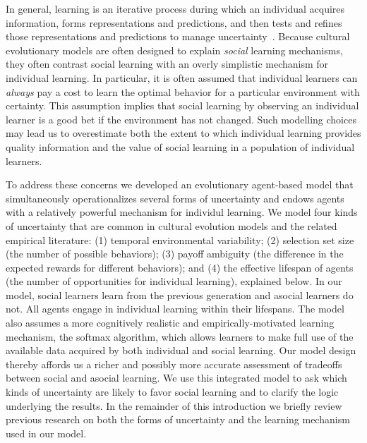 \documentclass[letterpaper,11.5pt]{scrartcl}
\begin{document}
In general, learning is an iterative
process during which an individual acquires information, forms representations and
predictions, and then tests and refines those representations and predictions to manage
uncertainty~\cite{jacobs2011bayesian,clark2013whatever}.  Because cultural evolutionary
models are often designed to explain \emph{social} learning mechanisms, they often contrast social learning with an overly simplistic mechanism for individual learning. In particular, it is often assumed that individual learners can \emph{always} pay a cost to learn the optimal behavior for a particular environment with certainty. This assumption implies that social learning by observing an individual learner is a good bet if the environment has not changed. Such modelling choices may lead us to overestimate both the extent to which individual learning provides
quality information and the value of social learning in a population of individual learners. %

To address these concerns we developed an evolutionary agent-based model that
simultaneously operationalizes several forms of uncertainty and endows agents
with a relatively powerful mechanism for individul learning. We model four kinds of
uncertainty that are common in cultural evolution models and the related empirical
literature:  (1) temporal environmental variability; (2) selection set size (the number of
possible behaviors); (3) payoff ambiguity (the difference in the expected rewards for
different behaviors); and (4) the effective lifespan of agents (the number of
opportunities for individual learning), explained below. In our model, social learners learn from the previous generation and asocial learners do not. All agents engage in individual learning within
their lifespans. The model also assumes a more
cognitively realistic and empirically-motivated learning mechanism, the softmax algorithm, which allows  learners to make full use of the available data acquired by both individual and social learning. 
Our model design thereby affords us a richer and possibly more accurate assessment of tradeoffs between 
social and asocial learning. 
We use this integrated model to ask which kinds of uncertainty are likely to favor social learning and to clarify the logic underlying the results.
In the remainder of this introduction we briefly review previous research on both the forms of uncertainty and the learning mechanism used in our model. 
\end{document}
